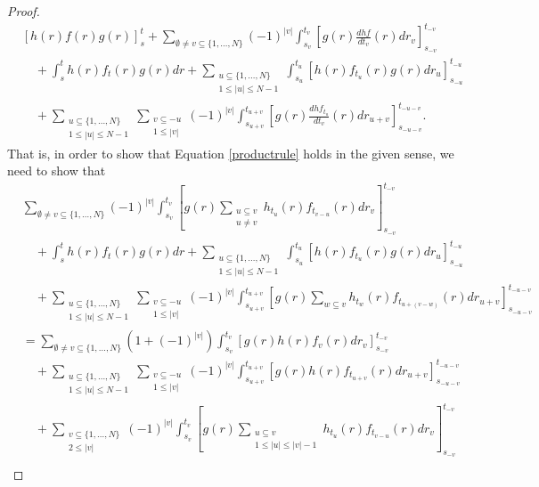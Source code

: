 \documentclass[10pt,a4paper]{amsart}
\begin{document}
\begin{proof}
\begin{equation*}
\begin{split}
&[h(r)f(r)g(r)]_s^t +\sum_{\emptyset\neq v \subseteq \{1,\dots,N\}}(-1)^{|v|} \int_{s_v}^{t_v} [g(r)\frac{dhf}{dt_v}(r) dr_v]_{s_{-v}}^{t_{-v}}\\
&\quad+\int_{s}^{t} h(r)f_t(r)g(r) dr + \sum_{\substack{u\subseteq\{1,\dots,N\}\\
1 \leq |u|\leq N-1}} \int_{s_u}^{t_u} [h(r)f_{t_u}(r)g(r)dr_u]_{s_{-u}}^{t_{-u}}\\
&\quad+ \sum_{\substack{u\subseteq\{1,\dots,N\}\\
1 \leq |u|\leq N-1}} \sum_{\substack{v\subseteq -u\\ 1\leq |v|}} (-1)^{|v|} \int_{s_{u+v}}^{t_{u+v}} \left[g(r) \frac{dhf_{t_u}}{dt_v}(r) dr_{u+v}\right]_{s_{-u-v}}^{t_{-u-v}}.
\end{split}
\end{equation*}
That is, in order to show that Equation \eqref{productrule} holds in the given sense, we need to show that
\begin{equation*}
\begin{split}
&\sum_{\emptyset\neq v \subseteq \{1,\dots,N\}}(-1)^{|v|} \int_{s_v}^{t_v} [g(r)\sum_{\substack{u\subseteq v\\ u \neq v}}h_{t_u}(r)f_{t_{v-u}}(r) dr_v]_{s_{-v}}^{t_{-v}}\\
&\quad +\int_{s}^{t} h(r)f_t(r)g(r) dr + \sum_{\substack{u\subseteq\{1,\dots,N\}\\
1 \leq |u|\leq N-1}} \int_{s_u}^{t_u} [h(r)f_{t_u}(r)g(r)dr_u]_{s_{-u}}^{t_{-u}}\\
&\quad+ \sum_{\substack{u\subseteq\{1,\dots,N\}\\
1 \leq |u|\leq N-1}} \sum_{\substack{v\subseteq -u\\ 1\leq |v|}} (-1)^{|v|} \int_{s_{u+v}}^{t_{u+v}} \left[g(r) \sum_{w\subseteq v} h_{t_w}(r) f_{t_{u+(v-w)}}(r) dr_{u+v}\right]_{s_{-u-v}}^{t_{-u-v}}\\
&= \sum_{\emptyset\neq v \subseteq \{1,\dots,N\}}(1+(-1)^{|v|}) \int_{s_v}^{t_v} [g(r)h(r)f_v(r) dr_v]_{s_{-v}}^{t_{-v}}\\
&\quad+ \sum_{\substack{u\subseteq\{1,\dots,N\}\\
1 \leq |u|\leq N-1}} \sum_{\substack{v\subseteq -u\\ 1\leq |v|}} (-1)^{|v|} \int_{s_{u+v}}^{t_{u+v}} \left[g(r) h(r) f_{t_{u+v}}(r) dr_{u+v}\right]_{s_{-u-v}}^{t_{-u-v}}\\
&\quad+ \sum_{\substack{v\subseteq \{1,\dots,N\} \\ 2 \leq |v|}}(-1)^{|v|} \int_{s_v}^{t_v} [g(r)\sum_{\substack{u\subseteq v\\ 1\leq |u| \leq |v|-1}}h_{t_u}(r)f_{t_{v-u}}(r) dr_v]_{s_{-v}}^{t_{-v}}\\

\end{split}
\end{equation*}
\end{proof}
\end{document}
